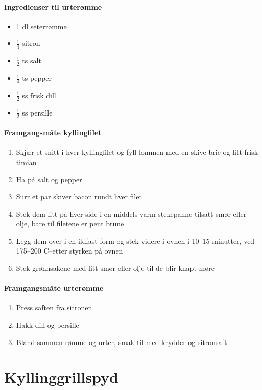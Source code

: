 \documentclass[12pt,a4paper]{book}
\begin{document}
{\paragraph{Ingredienser til urterømme}
\begin{itemize}[noitemsep]
	\item 1 dl seterrømme
	\item $\frac{1}{4}$  sitron
	\item $\frac{1}{2}$  ts salt
	\item $\frac{1}{4}$  ts pepper
	\item $\frac{1}{2}$  ss frisk dill
	\item $\frac{1}{2}$  ss persille
\end{itemize}

\paragraph{Framgangsmåte kyllingfilet}
\begin{enumerate}[noitemsep]
	\item Skjær et snitt i hver kyllingfilet og fyll lommen med en skive brie og litt frisk timian
	\item Ha på salt og pepper
	\item Surr et par skiver bacon rundt hver filet
	\item Stek dem litt på hver side i en middels varm stekepanne tilsatt smør eller olje, bare til filetene er pent brune
	\item Legg dem over i en ildfast form og stek videre i ovnen i 10--15 minutter, ved 175--200 \degree C--etter styrken på ovnen
	\item Stek grønnsakene med litt smør eller olje til de blir knapt møre
\end{enumerate}


\paragraph{Framgangsmåte urterømme}
\begin{enumerate}[noitemsep]
	\item Press saften fra sitronen
	\item Hakk dill og persille
	\item Bland sammen rømme og urter, smak til med krydder og sitronsaft
\end{enumerate}
\clearpage{}
\clearpage{}\section{﻿Kyllinggrillspyd}

}
\end{document}
